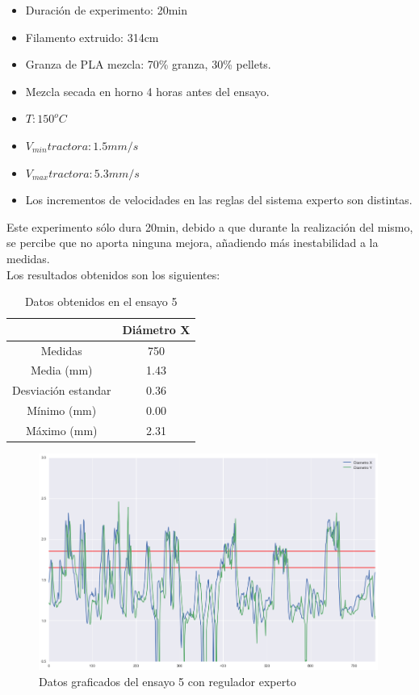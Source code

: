 \begin{itemize}
	\item{Duración de experimento: 20min}
	\item{Filamento extruido: 314cm}
	\item{Granza de PLA mezcla: 70\% granza, 30\% pellets.}
	\item{Mezcla secada en horno 4 horas antes del ensayo.}
	\item{$T: 150^oC$}
	\item{$V_{min} tractora: 1.5 mm/s$}
	\item{$V_{max} tractora: 5.3 mm/s$}
	\item{Los incrementos de velocidades en las reglas del sistema experto son distintas.}
\end{itemize}

Este experimento sólo dura 20min, debido a que durante la realización del mismo, se percibe que no aporta ninguna mejora, añadiendo más inestabilidad a la medidas.\\

Los resultados obtenidos son los siguientes:

\begin{table}[H]
	\centering
	\begin{tabular}{cc}
		                    & Diámetro X \\ \hline
		Medidas             & 750      \\
		Media (mm)          & 1.43       \\
		Desviación estandar & 0.36       \\
		Mínimo (mm)         & 0.00       \\
		Máximo (mm)         & 2.31      
	\end{tabular}
	\caption{Datos obtenidos en el ensayo 5}
	\label{tab:resl_ens5}
\end{table}

\begin{figure}[H]
    \centering
    \includegraphics[width=0.99\textwidth]{images/producciones/13082015/output_9_e2.png}
    \caption{Datos graficados del ensayo 5 con regulador experto}
    \label{fig:reg_graf5}
\end{figure}

